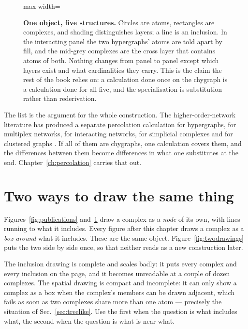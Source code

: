 \begin{figure}[t]
\begin{adjustbox}{max width=\linewidth}
\end{adjustbox}
\caption{\textbf{One object, five structures.} Circles are atoms, rectangles
are complexes, and shading distinguishes layers; a line is an inclusion. In the
interacting panel the two hypergraphs' atoms are told apart by fill, and the
mid-grey complexes are the cross layer that contains atoms of both. Nothing changes from panel to panel except which layers exist and
what cardinalities they carry. This is the claim the rest of the book relies on:
a calculation done once on the chygraph is a calculation done for all five, and
the specialisation is substitution rather than rederivation.}
\label{fig:mappings}
\end{figure}

The list is the argument for the whole construction. The
higher-order-network literature has produced a separate percolation calculation
for hypergraphs, for multiplex networks, for interacting networks, for
simplicial complexes and for clustered graphs
\citep{battiston2020,bianconi2021}. If all of them
are chygraphs, one calculation covers them, and the differences between them
become differences in what one substitutes at the end. Chapter~\ref{ch:percolation}
carries that out.

\section{Two ways to draw the same thing}
\label{sec:drawing}

Figures~\ref{fig:publications} and~\ref{fig:mappings} draw a complex as a
\emph{node} of its own, with lines running to what it includes. Every figure
after this chapter draws a complex as a \emph{box around} what it includes.
These are the same object. Figure~\ref{fig:twodrawings} puts the two side by
side once, so that neither reads as a new construction later.

The inclusion drawing is complete and scales badly: it puts every complex and
every inclusion on the page, and it becomes unreadable at a couple of dozen
complexes. The spatial drawing is compact and incomplete: it can only show a
complex as a box when the complex's members can be drawn adjacent, which
fails as soon as two complexes share more than one atom --- precisely the
situation of Sec.~\ref{sec:treelike}. Use the first when the question is what
includes what, the second when the question is what is near what.

